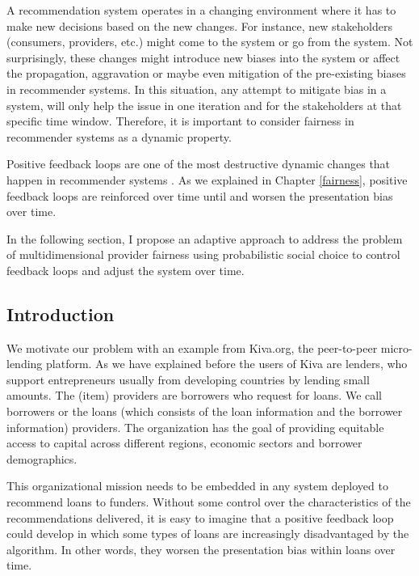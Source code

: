 \label{sec:dynamicfair}

A recommendation system operates in a changing environment where it has to make new decisions based on the new changes. For instance, new stakeholders (consumers, providers, etc.) might come to the system or go from the system. Not surprisingly, these changes might introduce new biases into the system or affect the propagation, aggravation or maybe even mitigation of the pre-existing biases in recommender systems. In this situation, any attempt to mitigate bias in a system, will only help the issue in one iteration and for the stakeholders at that specific time window. Therefore, it is important to consider fairness in recommender systems as a dynamic property.

Positive feedback loops are one of the most destructive dynamic changes that happen in recommender systems \cite{o2016weapons}. As we explained in Chapter \ref{fairness}, positive feedback loops are reinforced over time until and worsen the presentation bias over time.

In the following section, I propose an adaptive approach to address the problem of multidimensional provider fairness using probabilistic social choice to control feedback loops and adjust the system over time.

\subsection{Introduction}
\label{subsec:dyn_intro}

We motivate our problem with an example from Kiva.org, the peer-to-peer micro-lending platform. As we have explained before the users of Kiva are lenders, who support entrepreneurs usually from developing countries by lending small amounts.
The (item) providers are borrowers who request for loans. We call borrowers or the loans (which consists of the loan information and the borrower information) providers. The organization has the goal of providing equitable access to capital across different regions, economic sectors and borrower demographics.

This organizational mission needs to be embedded in any system deployed to recommend loans to funders. Without some control over the characteristics of the recommendations delivered, it is easy to imagine that a positive feedback loop \cite{sun2019debiasing} could develop in which some types of loans are increasingly disadvantaged by the algorithm. In other words, they worsen the presentation bias within loans over time.

